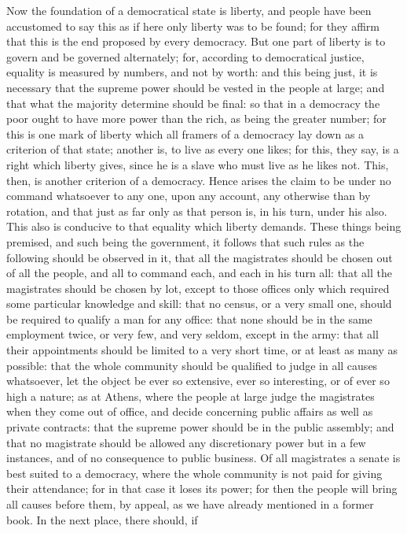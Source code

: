 Now the foundation of a democratical state is liberty, and people have
been accustomed to say this as if here only liberty was to be found; for
they affirm that this is the end proposed by every democracy. But one part
of liberty is to govern and be governed alternately; for, according to
democratical justice, equality is measured by numbers, and not by worth:
and this being just, it is necessary that the supreme power should be
vested in the people at large; and that what the majority determine should
be final: so that in a democracy the poor ought to have more power than
the rich, as being the greater number; for this is one mark of liberty
which all framers of a democracy lay down as a criterion of that state;
another is, to live as every one likes; for this, they say, is a right
which liberty gives, since he is a slave who must live as he likes not.
This, then, is another criterion of a democracy. Hence arises the claim to
be under no command whatsoever to any one, upon any account, any otherwise
than by rotation, and that just as far only as that person is, in his
turn, under his also. This also is conducive to that equality which
liberty demands. These things being premised, and such being the
government, it follows that such rules as the following should be observed
in it, that all the magistrates should be chosen out of all the people,
and all to command each, and each in his turn all: that all the
magistrates should be chosen by lot, except to those offices only which
required some particular knowledge and skill: that no census, or a very
small one, should be required to qualify a man for any office: that none
should be in the same employment twice, or very few, and very seldom,
except in the army: that all their appointments should be limited to a
very short time, or at least as many as possible: that the whole community
should be qualified to judge in all causes whatsoever, let the object be
ever so extensive, ever so interesting, or of ever so high a nature; as at
Athens, where the people at large judge the magistrates when they come out
of office, and decide concerning public affairs as well as private
contracts: that the supreme power should be in the public assembly; and
that no magistrate should be allowed any discretionary power but in a few
instances, and of no consequence to public business. Of all magistrates a
senate is best suited to a democracy, where the whole community is not
paid for giving their attendance; for in that case it loses its power; for
then the people will bring all causes before them, by appeal, as we have
already mentioned in a former book. In the next place, there should, if

